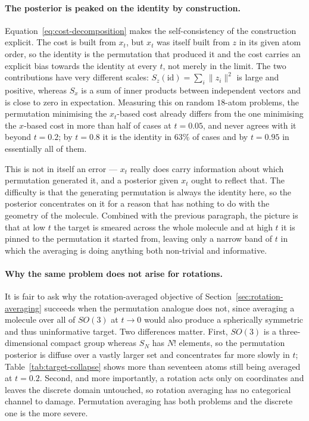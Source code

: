 \paragraph{The posterior is peaked on the identity by construction.}
Equation~\eqref{eq:cost-decomposition} makes the self-consistency of the construction explicit. The
cost is built from $x_t$, but $x_t$ was itself built from $z$ in its given atom order, so the
identity is the permutation that produced it and the cost carries an explicit bias towards the
identity at every $t$, not merely in the limit. The two contributions have very different scales:
$S_z(\mathrm{id}) = \sum_i \|z_i\|^2$ is large and positive, whereas $S_x$ is a sum of inner
products between independent vectors and is close to zero in expectation. Measuring this on random
$18$-atom problems, the permutation minimising the $x_t$-based cost already differs from the one
minimising the $x$-based cost in more than half of cases at $t = 0.05$, and never agrees with it
beyond $t = 0.2$; by $t = 0.8$ it is the identity in $63\%$ of cases and by $t = 0.95$ in
essentially all of them.

This is not in itself an error --- $x_t$ really does carry information about which permutation
generated it, and a posterior given $x_t$ ought to reflect that. The difficulty is that the
generating permutation is always the identity here, so the posterior concentrates on it for a
reason that has nothing to do with the geometry of the molecule. Combined with the previous
paragraph, the picture is that at low $t$ the target is smeared across the whole molecule and at
high $t$ it is pinned to the permutation it started from, leaving only a narrow band of $t$ in which
the averaging is doing anything both non-trivial and informative.

\paragraph{Why the same problem does not arise for rotations.}
It is fair to ask why the rotation-averaged objective of Section~\ref{sec:rotation-averaging}
succeeds when the permutation analogue does not, since averaging a molecule over all of $SO(3)$ at
$t \to 0$ would also produce a spherically symmetric and thus uninformative target. Two differences
matter. First, $SO(3)$ is a three-dimensional compact group whereas $S_N$ has $N!$ elements, so the
permutation posterior is diffuse over a vastly larger set and concentrates far more slowly in $t$;
Table~\ref{tab:target-collapse} shows more than seventeen atoms still being averaged at $t = 0.2$.
Second, and more importantly, a rotation acts only on coordinates and leaves the discrete domain
untouched, so rotation averaging has no categorical channel to damage. Permutation averaging has
both problems and the discrete one is the more severe.

